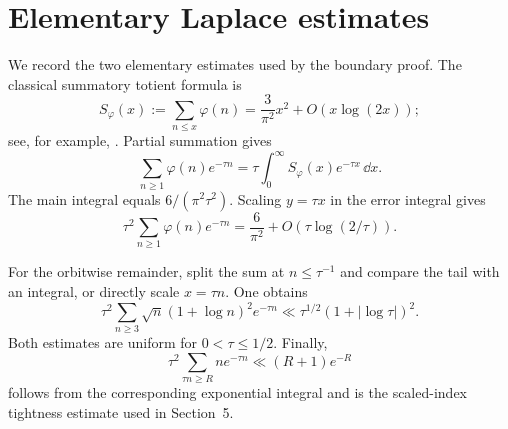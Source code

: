 \appendix
\section{Elementary Laplace estimates}

We record the two elementary estimates used by the boundary proof.  The
classical summatory totient formula is
\[
 S_\varphi(x):=\sum_{n\le x}\varphi(n)
 =\frac3{\pi^2}x^2+O(x\log(2x));
\]
see, for example, \citet{Apostol1976}.  Partial summation gives
\[
 \sum_{n\ge1}\varphi(n)e^{-\tau n}
 =\tau\int_0^\infty S_\varphi(x)e^{-\tau x}\,\dd x.
\]
The main integral equals $6/(\pi^2\tau^2)$.  Scaling $y=\tau x$ in the
error integral gives
\[
 \tau^2\sum_{n\ge1}\varphi(n)e^{-\tau n}
 =\frac6{\pi^2}+O(\tau\log(2/\tau)).
\]

For the orbitwise remainder, split the sum at $n\le\tau^{-1}$ and compare
the tail with an integral, or directly scale $x=\tau n$.  One obtains
\[
 \tau^2\sum_{n\ge3}\sqrt n(1+\log n)^2e^{-\tau n}
 \ll\tau^{1/2}(1+|\log\tau|)^2.
\]
Both estimates are uniform for $0<\tau\le1/2$.  Finally,
\[
 \tau^2\sum_{\tau n\ge R}ne^{-\tau n}
 \ll(R+1)e^{-R}
\]
follows from the corresponding exponential integral and is the scaled-index
tightness estimate used in Section~5.
